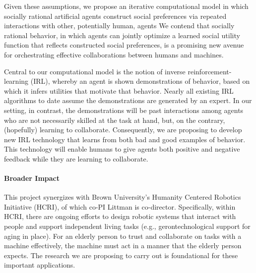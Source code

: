 Given these assumptions, we propose an iterative computational model
in which socially rational artificial agents construct social
preferences via repeated interactions with other, potentially human,
agents 
We contend that socially rational behavior, in which agents
can jointly optimize a learned social utility function that reflects
constructed social preferences, is a promising new avenue for
orchestrating effective collaborations between humans and machines.

Central to our computational model is the notion of inverse
reinforcement-learning (IRL), whereby an agent is shown demonstrations
of behavior, based on which it infers utilities that motivate that
behavior.  Nearly all existing IRL algorithms to date assume the
demonstrations are generated by an expert.  In our setting, in
contrast, the demonstrations will be past interactions among agents
who are not necessarily skilled at the task at hand, but, on the
contrary, (hopefully) learning to collaborate.  Consequently, we are
proposing to develop new IRL technology that learns from
both bad and good examples of behavior.  This technology will enable
humans to give agents both positive and negative feedback while they
are learning to collaborate.




\vspace{\up}
\paragraph{Broader Impact}
%
This project synergizes with Brown University's Humanity Centered
Robotics Initiative (HCRI), of which co-PI Littman is co-director.
Specifically, within HCRI, there are ongoing efforts to design robotic
systems that interact with people and support independent living tasks
(e.g., gerontechnological support for aging in place).  For an elderly
person to trust and collaborate on tasks with a machine effectively,
the machine must act in a manner that the elderly person expects.  The
research we are proposing to carry out is foundational for these
important applications.

